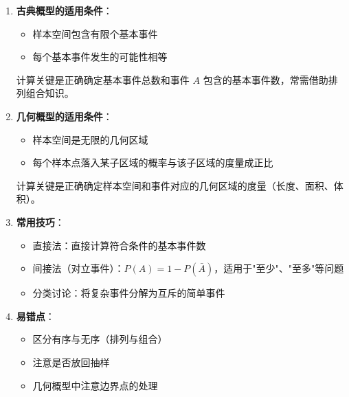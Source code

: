 \documentclass[11pt]{ctexrep}
\begin{document}
\begin{enumerate}
    \item \textbf{古典概型的适用条件}：
    \begin{itemize}
        \item 样本空间包含有限个基本事件
        \item 每个基本事件发生的可能性相等
    \end{itemize}
    计算关键是正确确定基本事件总数和事件 $A$ 包含的基本事件数，常需借助排列组合知识。
    
    \item \textbf{几何概型的适用条件}：
    \begin{itemize}
        \item 样本空间是无限的几何区域
        \item 每个样本点落入某子区域的概率与该子区域的度量成正比
    \end{itemize}
    计算关键是正确确定样本空间和事件对应的几何区域的度量（长度、面积、体积）。
    
    \item \textbf{常用技巧}：
    \begin{itemize}
        \item 直接法：直接计算符合条件的基本事件数
        \item 间接法（对立事件）：$P(A) = 1 - P(\bar{A})$，适用于"至少"、"至多"等问题
        \item 分类讨论：将复杂事件分解为互斥的简单事件
    \end{itemize}
    
    \item \textbf{易错点}：
    \begin{itemize}
        \item 区分有序与无序（排列与组合）
        \item 注意是否放回抽样
        \item 几何概型中注意边界点的处理
    \end{itemize}
\end{enumerate}
\end{document}
